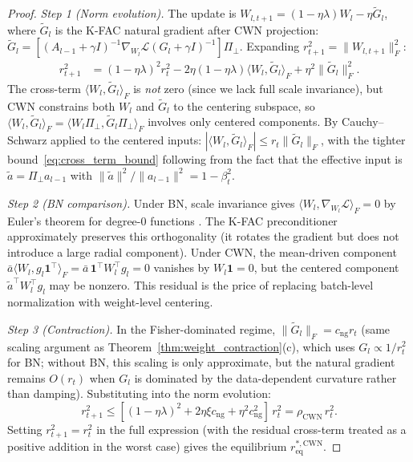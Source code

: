 \documentclass{article}
\providecommand{\norm}[1]{\lVert #1 \rVert}
\theoremstyle{plain}
\theoremstyle{definition}
\theoremstyle{remark}
\begin{document}
\begin{proof}
\emph{Step 1 (Norm evolution).} The update is $W_{l,t+1} = (1-\eta\lambda)W_l - \eta\tilde{G}_l$, where $\tilde{G}_l$ is the K-FAC natural gradient after CWN projection: $\tilde{G}_l = [(A_{l-1}+\gamma I)^{-1}\nabla_{W_l}\mathcal{L}(G_l+\gamma I)^{-1}]\Pi_\perp$. Expanding $r_{t+1}^2 = \norm{W_{l,t+1}}_F^2$:
\begin{align}
    r_{t+1}^2 &= (1-\eta\lambda)^2 r_t^2 - 2\eta(1-\eta\lambda)\langle W_l, \tilde{G}_l\rangle_F + \eta^2\norm{\tilde{G}_l}_F^2.
\end{align}
The cross-term $\langle W_l, \tilde{G}_l\rangle_F$ is \emph{not} zero (since we lack full scale invariance), but CWN constrains both $W_l$ and $\tilde{G}_l$ to the centering subspace, so $\langle W_l, \tilde{G}_l\rangle_F = \langle W_l\Pi_\perp, \tilde{G}_l\Pi_\perp\rangle_F$ involves only centered components. By Cauchy--Schwarz applied to the centered inputs: $|\langle W_l, \tilde{G}_l\rangle_F| \leq r_t\norm{\tilde{G}_l}_F$, with the tighter bound~\eqref{eq:cross_term_bound} following from the fact that the effective input is $\tilde{a} = \Pi_\perp a_{l-1}$ with $\norm{\tilde{a}}^2/\norm{a_{l-1}}^2 = 1 - \beta_t^2$.

\emph{Step 2 (BN comparison).} Under BN, scale invariance gives $\langle W_l, \nabla_{W_l}\mathcal{L}\rangle_F = 0$ by Euler's theorem for degree-0 functions \citep{arora2019theoretical}. The K-FAC preconditioner approximately preserves this orthogonality (it rotates the gradient but does not introduce a large radial component). Under CWN, the mean-driven component $\bar{a}\langle W_l, g_l\mathbf{1}^\top\rangle_F = \bar{a}\,\mathbf{1}^\top W_l^\top g_l = 0$ vanishes by $W_l\mathbf{1} = 0$, but the centered component $\tilde{a}^\top W_l^\top g_l$ may be nonzero. This residual is the price of replacing batch-level normalization with weight-level centering.

\emph{Step 3 (Contraction).} In the Fisher-dominated regime, $\norm{\tilde{G}_l}_F = c_{\mathrm{ng}} r_t$ (same scaling argument as Theorem~\ref{thm:weight_contraction}(c), which uses $G_l \propto 1/r_t^2$ for BN; without BN, this scaling is only approximate, but the natural gradient remains $O(r_t)$ when $G_l$ is dominated by the data-dependent curvature rather than damping). Substituting into the norm evolution:
\begin{equation}
    r_{t+1}^2 \leq [(1-\eta\lambda)^2 + 2\eta\xi c_{\mathrm{ng}} + \eta^2 c_{\mathrm{ng}}^2]\,r_t^2 = \rho_{\mathrm{CWN}}\,r_t^2.
\end{equation}
Setting $r_{t+1}^2 = r_t^2$ in the full expression (with the residual cross-term treated as a positive addition in the worst case) gives the equilibrium $r_{\mathrm{eq}}^{*,\mathrm{CWN}}$.
\end{proof}
\end{document}
